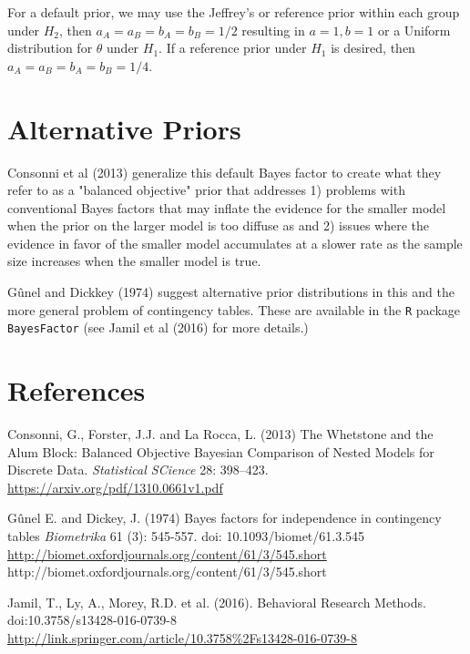 \documentclass[11pt]{article}
\begin{document}
For a default prior, we may use the Jeffrey's or reference prior within each group under $H_2$, then $a_A = a_B = b_A = b_B = 1/2$ resulting in $a = 1, b=1$ or a Uniform distribution for $\theta$ under $H_1$.  If a reference prior under $H_1$ is desired, then  $a_A = a_B = b_A = b_B = 1/4$.   



\section*{Alternative Priors}

Consonni et al (2013) generalize this default Bayes factor to create what they refer to as a "balanced objective"  prior that addresses 1) problems with conventional Bayes factors that may inflate  the evidence for the smaller model when the prior on the larger model is too diffuse as and 2) issues where the evidence in favor of the smaller model accumulates at a slower rate as the sample size increases when the smaller model is true.

G\^unel and Dickkey (1974) suggest alternative prior distributions in this and the more general problem of contingency tables.  These are available in the {\tt R} package {\tt BayesFactor}  (see  Jamil et al (2016) for more details.)

\section*{References}
Consonni, G., Forster, J.J. and La Rocca, L. (2013) The Whetstone and the Alum Block:  Balanced Objective Bayesian Comparison of Nested Models for Discrete Data. {\it Statistical SCience} 28: 398--423.
\url{https://arxiv.org/pdf/1310.0661v1.pdf}

\vspace{12pt}
\noindent
G\^unel E. and Dickey, J. (1974) Bayes factors for independence in contingency tables
{\it Biometrika}  61 (3): 545-557.
doi: 10.1093/biomet/61.3.545 \url{http://biomet.oxfordjournals.org/content/61/3/545.short}
http://biomet.oxfordjournals.org/content/61/3/545.short

\vspace{12pt}
\noindent
Jamil, T., Ly, A., Morey, R.D. et al. (2016). Behavioral  Research Methods.  doi:10.3758/s13428-016-0739-8  \url{http://link.springer.com/article/10.3758\%2Fs13428-016-0739-8}
\end{document}
